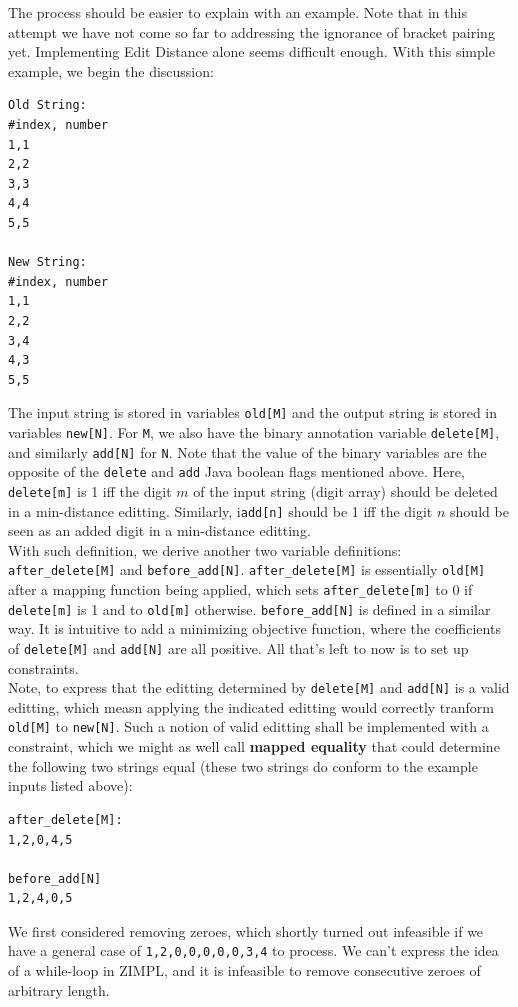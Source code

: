 \documentclass{article}
\begin{document}
The process should be easier to explain with an example. Note that in this attempt we have not come so far to addressing the ignorance of bracket pairing yet. Implementing Edit Distance alone seems difficult enough. With this simple example, we begin the discussion:
\begin{lstlisting}
Old String:
#index, number
1,1
2,2
3,3
4,4
5,5

New String:
#index, number
1,1
2,2
3,4
4,3
5,5
\end{lstlisting}
The input string is stored in variables \texttt{old[M]} and the output string is stored in variables \texttt{new[N]}. For \texttt{M}, we also have the binary annotation variable \texttt{delete[M]}, and similarly \texttt{add[N]} for \texttt{N}. Note that the value of the binary variables are the opposite of the \texttt{delete} and \texttt{add} Java boolean flags mentioned above. Here, \texttt{delete[m]} is 1 iff the digit $m$ of the input string (digit array) should be deleted in a min-distance editting. Similarly, i\texttt{add[n]} should be 1 iff the digit $n$ should be seen as an added digit in a min-distance editting. \\

With such definition, we derive another two variable definitions: \texttt{after\_delete[M]} and \texttt{before\_add[N]}.  \texttt{after\_delete[M]} is essentially \texttt{old[M]} after a mapping function being applied, which sets \texttt{after\_delete[m]} to 0 if \texttt{delete[m]} is 1 and to \texttt{old[m]} otherwise. \texttt{before\_add[N]} is defined in a similar way. It is intuitive to add a minimizing objective function, where the coefficients of \texttt{delete[M]} and \texttt{add[N]} are all positive. All that's left to now is to set up constraints. \\

Note, to express that the editting determined by \texttt{delete[M]} and \texttt{add[N]} is a valid editting, which measn applying the indicated editting would correctly tranform \texttt{old[M]} to \texttt{new[N]}. Such a notion of valid editting shall be implemented with a constraint, which we might as well call \textbf{mapped equality} that could determine the following two strings equal (these two strings do conform to the example inputs listed above):
\begin{lstlisting}
after_delete[M]:
1,2,0,4,5

before_add[N]
1,2,4,0,5
\end{lstlisting}
We first considered removing zeroes, which shortly turned out infeasible if we have a general case of \texttt{1,2,0,0,0,0,0,3,4} to process. We can't express the idea of a while-loop in ZIMPL, and it is infeasible to remove consecutive zeroes of arbitrary length. \\
\end{document}
